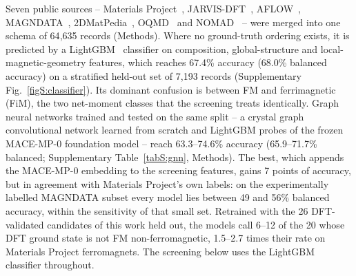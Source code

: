 \documentclass[aps,prb,preprint,superscriptaddress,longbibliography,nofootinbib]{revtex4-2}
\begin{document}
Seven public sources -- Materials Project~\cite{jain2013}, JARVIS-DFT~\cite{choudhary2020},
AFLOW~\cite{curtarolo2012}, MAGNDATA~\cite{gallego2016a,gallego2016b}, 2DMatPedia~\cite{zhou2019},
OQMD~\cite{saal2013,kirklin2015} and NOMAD~\cite{draxl2018} -- were merged into one schema of 64{,}635 records
(Methods). Where no ground-truth ordering exists, it is predicted by a LightGBM~\cite{ke2017} classifier on
composition, global-structure and local-magnetic-geometry features, which reaches 67.4\% accuracy (68.0\%
balanced accuracy) on a stratified held-out set of 7{,}193 records (Supplementary Fig.~\ref{figS:classifier}).
Its dominant confusion is between FM and ferrimagnetic (FiM), the two net-moment classes that the screening treats
identically. Graph neural networks trained and tested on the same split -- a crystal graph convolutional network
learned from scratch and LightGBM probes of the frozen MACE-MP-0 foundation model -- reach 63.3--74.6\% accuracy
(65.9--71.7\% balanced; Supplementary Table~\ref{tabS:gnn}, Methods). The best, which appends the MACE-MP-0
embedding to the screening features, gains 7 points of accuracy, but in agreement with Materials Project's own
labels: on the experimentally labelled MAGNDATA subset every model lies between 49 and 56\% balanced accuracy,
within the sensitivity of that small set. Retrained with
the 26 DFT-validated candidates of this work held out, the models call 6--12 of the 20 whose DFT ground state is not FM
non-ferromagnetic, 1.5--2.7 times their rate on Materials Project ferromagnets. The screening below uses the
LightGBM classifier throughout.
\end{document}
